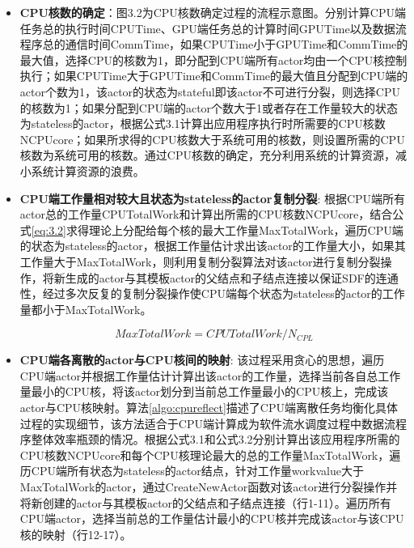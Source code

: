 \begin{itemize}	
  \item {\bf CPU核数的确定}：图3.2为CPU核数确定过程的流程示意图。分别计算CPU端任务总的执行时间CPUTime、GPU端任务总的计算时间GPUTime以及数据流程序总的通信时间CommTime，如果CPUTime小于GPUTime和CommTime的最大值，选择CPU的核数为1，即分配到CPU端所有actor均由一个CPU核控制执行；如果CPUTime大于GPUTime和CommTime的最大值且分配到CPU端的actor个数为1，该actor的状态为stateful即该actor不可进行分裂，则选择CPU的核数为1；如果分配到CPU端的actor个数大于1或者存在工作量较大的状态为stateless的actor，根据公式3.1计算出应用程序执行时所需要的CPU核数NCPUcore；如果所求得的CPU核数大于系统可用的核数，则设置所需的CPU核数为系统可用的核数。通过CPU核数的确定，充分利用系统的计算资源，减小系统计算资源的浪费。

  \item {\bf CPU端工作量相对较大且状态为stateless的actor复制分裂}: 根据CPU端所有actor总的工作量CPUTotalWork和计算出所需的CPU核数NCPUcore，结合公式\ref{eq:3.2}求得理论上分配给每个核的最大工作量MaxTotalWork，遍历CPU端的状态为stateless的actor，根据工作量估计求出该actor的工作量大小，如果其工作量大于MaxTotalWork，则利用复制分裂算法对该actor进行复制分裂操作，将新生成的actor与其模板actor的父结点和子结点连接以保证SDF的连通性，经过多次反复的复制分裂操作使CPU端每个状态为stateless的actor的工作量都小于MaxTotalWork。
  
  \begin{equation}
    MaxTotalWork = CPUTotalWork/N_{CPL} \label{eq:3.2}
  \end{equation}

  \item {\bf CPU端各离散的actor与CPU核间的映射}: 该过程采用贪心的思想，遍历CPU端actor并根据工作量估计计算出该actor的工作量，选择当前各自总工作量最小的CPU核，将该actor划分到当前总工作量最小的CPU核上，完成该actor与CPU核映射。算法\ref{algo:cpureflect}描述了CPU端离散任务均衡化具体过程的实现细节，该方法适合于CPU端计算成为软件流水调度过程中数据流程序整体效率瓶颈的情况。根据公式3.1和公式3.2分别计算出该应用程序所需的CPU核数NCPUcore和每个CPU核理论最大的总的工作量MaxTotalWork，遍历CPU端所有状态为stateless的actor结点，针对工作量workvalue大于MaxTotalWork的actor，通过CreateNewActor函数对该actor进行分裂操作并将新创建的actor与其模板actor的父结点和子结点连接（行1-11）。遍历所有CPU端actor，选择当前总的工作量估计最小的CPU核并完成该actor与该CPU核的映射（行12-17）。
\end{itemize}

